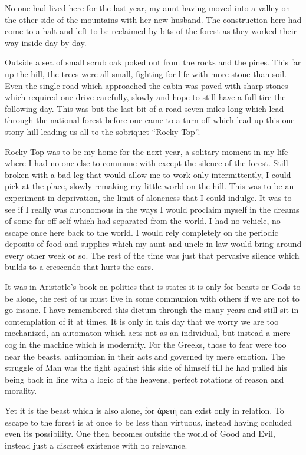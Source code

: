 \documentclass[ebook, 10pt, openright, onecolumn]{memoir}
\newcommand{\textgreek}[1]{\begingroup\fontencoding{LGR}\selectfont#1\endgroup}
\begin{document}
No one had lived here for the last year, my aunt having moved into a valley on
the other side of the mountains with her new husband.  The construction here had
come to a halt and left to be reclaimed by bits of the forest as they worked
their way inside day by day.  

Outside a sea of small scrub oak poked out from the rocks and the pines.  This
far up the hill, the trees were all small, fighting for life with more stone
than soil.  Even the single road which approached the cabin was paved with sharp
stones which required one drive carefully, slowly and hope to still have a full
tire the following day. This was but the last bit of a road seven miles long
which lead through the national forest before one came to a turn off which lead
up this one stony hill leading us all to the sobriquet ``Rocky Top''.

Rocky Top was to be my home for the next year, a solitary moment in my life
where I had no one else to commune with except the silence of the forest.  Still
broken with a bad leg that would allow me to work only intermittently, I could
pick at the place, slowly remaking my little world on the hill.  This was to be
an experiment in deprivation, the limit of aloneness that I could indulge.  It
was to see if I really was autonomous in the ways I would proclaim myself in the
dreams of some far off self which had separated from the world.  I had no
vehicle, no escape once here back to the world.  I would rely completely on the
periodic deposits of food and supplies which my aunt and uncle-in-law would
bring around every other week or so.  The rest of the time  was just that
pervasive silence which builds to a crescendo that hurts the ears.

It was in Aristotle's book on politics that is states it is only for beasts or
Gods to be alone, the rest of us must live in some communion with others if we
are not to go insane.  I have remembered this dictum through the many years and
still sit in contemplation of it at times.  It is only in this day that we worry
we are too mechanized, an automaton which acts not as an individual, but instead
a mere cog in the machine which is modernity.  For the Greeks, those to fear
were too near the beasts, antinomian in their acts and governed by mere emotion.
The struggle of Man was the fight against this side of himself till he had
pulled his being back in line with a logic of the heavens, perfect rotations of
reason and morality.

Yet it is the beast which is also alone, for \textgreek{ἀρετή} can exist only in
relation.  To escape to the forest is at once to be less than virtuous, instead
having occluded even its possibility.  One then becomes outside the world of
Good and Evil, instead just a discreet existence with no relevance.
\end{document}
